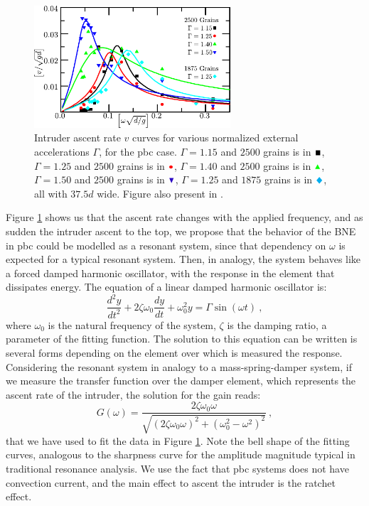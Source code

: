\begin{figure}
    \centering
    \includegraphics[width=0.65\textwidth]{04-figuras/BNE_ResonancePBC.pdf}
    \caption[BNE with periodic boundary: resonance.]{Intruder ascent rate $v$ curves for various normalized external accelerations $ \Gamma $, for the pbc case. $\Gamma = 1.15$ and $2500$ grains is in $\textcolor{black}{\blacksquare}$, $\Gamma = 1.25$ and $2500$ grains is in $\textcolor{red}{\bullet}$, $\Gamma = 1.40$ and $2500$ grains is in $\textcolor{green}{\blacktriangle}$, $\Gamma = 1.50$ and $2500$ grains is in $\textcolor{blue}{\blacktriangledown}$, $\Gamma = 1.25$ and $1875$ grains is in $\textcolor{cyan}{\Diamondblack}$, all with $37.5d$ wide. Figure also present in \cite{Large-deviation_quantification_of_boundary_conditions_on_the_Brazil_nut_effect}.}
    \label{fig:BNE_resonance}
\end{figure}

    Figure \ref{fig:BNE_resonance} shows us that the ascent rate changes with the applied frequency, and as sudden the intruder ascent to the top, we propose that the behavior of the BNE in pbc could be modelled as a resonant system, since that dependency on $\omega$ is expected for a typical resonant system. Then, in analogy, the system behaves like a forced damped harmonic oscillator, with the response in the element that dissipates energy. The equation of a linear damped harmonic oscillator is:
%
\begin{equation}
    \frac{d^2 y}{d t^2} + 2 \zeta \omega_0 \frac{d y} {d t} + \omega_0^2 y = \Gamma \sin(\omega t) ~,  
\end{equation}
%
where $\omega_0$ is the natural frequency of the system, $\zeta$ is the damping ratio, a parameter of the fitting function. The solution to this equation can be written is several forms depending on the element over which is measured the response. Considering the resonant system in analogy to a mass-spring-damper system, if we measure the transfer function over the damper element, which represents the ascent rate of the intruder, the solution for the gain reads:
%
\begin{equation}
    G(\omega) = \frac{2 \zeta \omega_0 \omega }{ \sqrt{(2 \zeta \omega_0 \omega)^2 + (\omega_0^2 - \omega^2)^2 }}~,
    \label{equ:TF}
\end{equation}
%
that we have used to fit the data in Figure \ref{fig:BNE_resonance}. Note the bell shape of the fitting curves, analogous to the sharpness curve for the amplitude magnitude typical in traditional resonance analysis. We use the fact that pbc systems does not have convection current, and the main effect to ascent the intruder is the ratchet effect.

